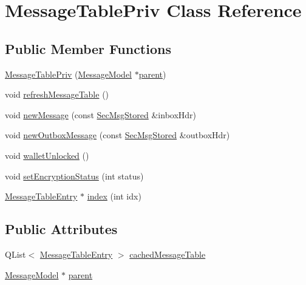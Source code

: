 \hypertarget{class_message_table_priv}{}\section{Message\+Table\+Priv Class Reference}
\label{class_message_table_priv}
\subsection*{Public Member Functions}
\begin{DoxyCompactItemize}
\item 
\hyperlink{class_message_table_priv_a1bb3ea4ad988ee9832d757b09094b63d}{Message\+Table\+Priv} (\hyperlink{class_message_model}{Message\+Model} $\ast$\hyperlink{class_message_table_priv_a74b87dfad5028d83a91cbde919b9c908}{parent})
\item 
void \hyperlink{class_message_table_priv_a0c420e61982703babe27416089ff2bd3}{refresh\+Message\+Table} ()
\item 
void \hyperlink{class_message_table_priv_a7769c63c504ab64c04e0699c4f4aacd3}{new\+Message} (const \hyperlink{class_sec_msg_stored}{Sec\+Msg\+Stored} \&inbox\+Hdr)
\item 
void \hyperlink{class_message_table_priv_a4718ccab000f83181ada7e74df2e80b4}{new\+Outbox\+Message} (const \hyperlink{class_sec_msg_stored}{Sec\+Msg\+Stored} \&outbox\+Hdr)
\item 
void \hyperlink{class_message_table_priv_a21b0c066bfb4d0efe388ebe83317c33f}{wallet\+Unlocked} ()
\item 
void \hyperlink{class_message_table_priv_abe5ab36edddd1fd4c1a0b6c63d0ea70d}{set\+Encryption\+Status} (int status)
\item 
\hyperlink{struct_message_table_entry}{Message\+Table\+Entry} $\ast$ \hyperlink{class_message_table_priv_a486a0f31e9010cc15e0544f65cb07211}{index} (int idx)
\end{DoxyCompactItemize}
\subsection*{Public Attributes}
\begin{DoxyCompactItemize}
\item 
Q\+List$<$ \hyperlink{struct_message_table_entry}{Message\+Table\+Entry} $>$ \hyperlink{class_message_table_priv_a680444470b8af7cd4bf84dbe488948c2}{cached\+Message\+Table}
\item 
\hyperlink{class_message_model}{Message\+Model} $\ast$ \hyperlink{class_message_table_priv_a74b87dfad5028d83a91cbde919b9c908}{parent}
\end{DoxyCompactItemize}



